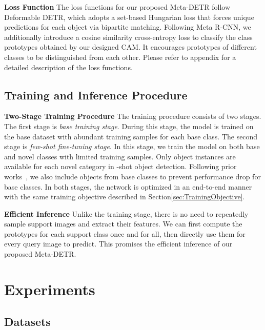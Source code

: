 \documentclass[letterpaper]{article} \usepackage{aaai22}  \usepackage{times}  \usepackage{helvet}  \usepackage{courier}  \usepackage[hyphens]{url}  \usepackage{graphicx} \urlstyle{rm} \def\UrlFont{\rm}  \usepackage{natbib}  \usepackage{caption} \DeclareCaptionStyle{ruled}{labelfont=normalfont,labelsep=colon,strut=off} \frenchspacing  \setlength{\pdfpagewidth}{8.5in}  \setlength{\pdfpageheight}{11in}  \usepackage{algorithm}
\begin{document}
\smallskip
\noindent\textbf{Loss Function\;\;}
The loss functions for our proposed Meta-DETR follow Deformable DETR\;\cite{DeformableDETR}, which adopts a set-based Hungarian loss that forces unique predictions for each object via bipartite matching. Following Meta R-CNN\;\cite{metarcnn}, we additionally introduce a cosine similarity cross-entropy loss\;\cite{CloserFewshotClassification} to classify the class prototypes obtained by our designed CAM. It encourages prototypes of different classes to be distinguished from each other. Please refer to appendix for a detailed description of the loss functions.


\subsection{Training and Inference Procedure}
\noindent\textbf{Two-Stage Training Procedure\;\;}
The training procedure consists of two stages.
The first stage is \textit{base training stage}. During this stage, the model is trained on the base dataset  with abundant training samples for each base class.
The second stage is \textit{few-shot fine-tuning stage}. In this stage, we train the model on both base and novel classes with limited training samples. Only  object instances are available for each novel category in -shot object detection. Following prior works~\cite{metarcnn,fsdet,FSDetView}, we also include objects from base classes to prevent performance drop for base classes. In both stages, the network is optimized in an end-to-end manner with the same training objective described in Section\;\ref{sec:TrainingObjective}.

\smallskip
\noindent\textbf{Efficient Inference\;\;}
Unlike the training stage, there is no need to repeatedly sample support images and extract their features. We can first compute the prototypes for each support class once and for all, then directly use them for every query image to predict. This promises the efficient inference of our proposed Meta-DETR.



\vspace{-1.50mm}
\section{Experiments}

\subsection{Datasets}
\end{document}
